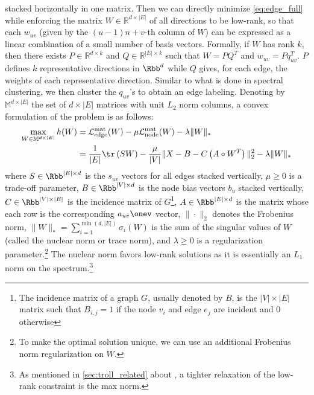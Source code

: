\iffalse
stacked horizontally in
one matrix. Then we can directly minimize \eqref{eq:edge_full} while enforcing the matrix
$W\in\mathbb{R}^{d\times |E|}$ of all directions to be low-rank, so that each $w_{uv}$ (given by the
$(u-1)n+v$-th column of $W$) can be expressed as a linear combination of a small number of basis
vectors. Formally, if $W$ has rank $k$, then there exists $P\in\mathbb{R}^{d\times k}$ and
$Q\in\mathbb{R}^{|E|\times k}$ such that $W=PQ^T$ and $w_{uv} = Pq_{uv}^T$. $P$ defines $k$
representative directions in $\Rbb^d$ while $Q$ gives, for each edge, the weights of each
representative direction. Similar to what is done in spectral clustering, we then cluster the
$q_{uv}$'s to obtain an edge labeling.
%
Denoting by $\mathbb{M}^{d\times |E|}$ the set of $d\times |E|$ matrices with unit $L_2$ norm
columns, a convex formulation of the problem is
as follows:
\begin{align}
  \label{eq:fact_convex}
  \max_{W\in\mathbb{M}^{d\times |E|}} h(W) &=
  \mathcal{L}_{\mathrm{edge}}^{\mathrm{mat}}(W) -
  \mu \mathcal{L}_{\mathrm{node}}^{\mathrm{mat}}(W) - \lambda \|W\|_* \\
  &= \frac{1}{|E|} \tr\left(SW\right) -
  \frac{\mu}{|V|} \|X - B - C\left(A\circ W^T \right)\|_2^2 - \lambda \|W\|_*
\end{align}
where $S \in \Rbb^{|E| \times d}$ is the $s_{uv}$ vectors for all edges stacked vertically, $\mu
\geq 0$ is a trade-off parameter, $B\in \Rbb^{|V| \times d}$ is the node bias vectors $b_u$ stacked
vertically, $C \in \Rbb^{|V| \times |E|}$ is the incidence matrix of $G$\footnote{The incidence
matrix of a graph $G$, usually denoted by $B$, is the $|V| \times |E|$ matrix such that $B_{i,j} =
1$ if the node $v_i$ and edge $e_j$ are incident and 0 otherwise}, $A \in \Rbb^{|E| \times d}$ is
the matrix whose each row is the corresponding $a_{uv}\onev$ vector, $\|\cdot\|_2$ denotes the
Frobenius norm, $\|W\|_* =
\sum_{i=1}^{\min(d,|E|)}\sigma_i(W)$ is the sum of the singular values of $W$ (called the nuclear
norm or trace norm), and $\lambda \geq 0$ is a regularization parameter.\footnote{To make the
optimal solution unique, we can use an additional Frobenius norm regularization on $W$.} The nuclear norm
favors low-rank solutions as it is essentially an $L_1$ norm on the spectrum.\footnote{As mentioned
in \autoref{sec:troll_related} about \autocite{OnlineCompletion17}, a tighter relaxation of the
low-rank constraint is the max norm.}
